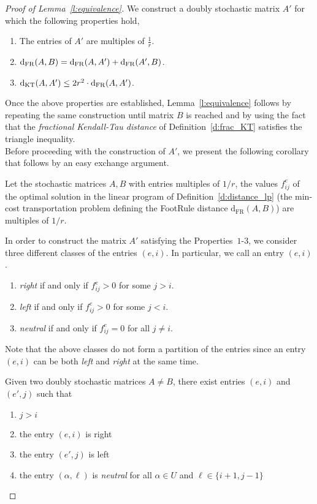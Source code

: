 \begin{proof}[Proof of Lemma~\ref{l:equivalence}]
    We construct a doubly stochastic matrix $A'$ for which the following properties hold,
    \begin{enumerate}
        \item The entries of $A'$ are multiples of $\frac{1}{r}$.
        \item $\mathrm{d}_{\mathrm{FR}}(A,B) = \mathrm{d}_{\mathrm{FR}}(A, A') + \mathrm{d}_{\mathrm{FR}}(A',B)$.
        \item $\mathrm{d}_{\mathrm{KT}}( A, A' ) \leq 2r^2 \cdot  \mathrm{d}_{\mathrm{FR}}(A, A')$.
    \end{enumerate}
    
\noindent Once the above properties are established, Lemma~\ref{l:equivalence} follows by repeating the same construction until matrix $B$ is reached
and by using the fact that the \textit{fractional Kendall-Tau distance} of Definition~\ref{d:frac_KT}
satisfies the triangle inequality.\\

\noindent Before proceeding with the construction of $A'$, we present the following corollary that follows by an easy exchange argument.
\begin{corollary}\label{c:flow}
    Let the stochastic matrices $A,B$ with entries multiples of $1/r$, the values $f_{ij}^e$ of the optimal solution in the linear program of Definition~\ref{d:distance_lp} (the min-cost transportation problem defining the FootRule distance $\mathrm{d}_{\mathrm{FR}}(A,B)$) are multiples of $1/r$.
    \end{corollary}

\noindent In order to construct the matrix $A'$ satisfying the Properties~$1$-$3$, we consider three different classes of the entries $(e,i)$. In particular, we call an entry $(e,i)$.
    \begin{enumerate}
        \item \textit{right} if and only if $f_{ij}^e > 0$ for some $j > i$.
        \item \textit{left} if and only if $f_{ij}^e > 0 $ for some $j < i$.
        \item \textit{neutral} if and only if $f_{ij}^e = 0$ for all $j \neq i$.
    \end{enumerate}
    
\noindent Note that the above classes do not form a partition of the entries since an entry $(e,i)$ can be both \textit{left} and \textit{right} at the same time.    

\begin{corollary}\label{cor:2}
    Given two doubly stochastic matrices $A \neq B$, there exist entries $(e,i)$ and $(e',j)$ such that
    \begin{enumerate}
        \item $j > i$
        \item the entry $(e,i)$ is right
        \item the entry $(e',j)$ is left
        \item the entry $(\alpha,\ell)$ is \textit{neutral} for all $\alpha \in U$ and $\ell \in \{i+1,j-1\}$
    \end{enumerate}
    \end{corollary}
    

\end{proof}
